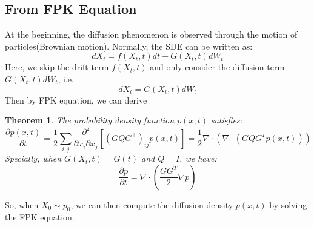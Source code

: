 \documentclass{article}
\newtheorem{theorem}{Theorem}
\begin{document}
\subsection{From FPK Equation}
At the beginning, the diffusion phenomenon is observed through the motion of particles(Brownian motion). 
Normally, the SDE can be written as:
\begin{equation}
    dX_t = f(X_t, t)dt + G(X_t, t)dW_t
\end{equation}
Here, we skip the drift term $f(X_t, t)$ and only consider the diffusion term $G(X_t, t)dW_t$, i.e.
\begin{equation}
    dX_t = G(X_t, t)dW_t
\end{equation}
Then by FPK equation, we can derive 
\begin{theorem}
    The probability density function $p(x, t)$ satisfies:
\begin{equation}
    \frac{\partial p(x, t)}{\partial t} = \frac{1}{2} \sum_{i, j} \frac{\partial^{2}}{\partial x_{i} \partial x_{j}}\left[\left(G Q G^{\top}\right)_{i j} p(x, t)\right]=\frac{1}{2}\nabla \cdot \left(\nabla\cdot (GQG^Tp(x, t))\right)
\end{equation}
Specially, when $G(X_t, t)=G(t)$ and $Q=I$, we have:
\begin{equation}
    \frac{\partial p}{\partial t} = \nabla \cdot \left(\frac{GG^T}{2}\nabla p\right)
\end{equation}
\end{theorem}
So, when $X_0\sim p_0$, we can then compute the diffusion density $p(x, t)$ by solving the FPK equation.
\end{document}
